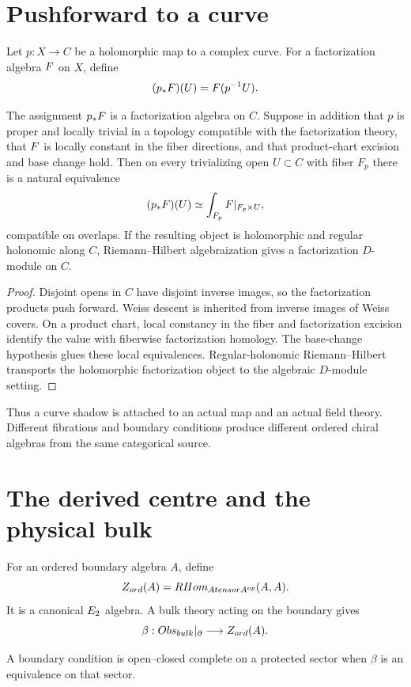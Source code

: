 \chapter{Pushforward to a curve}
Let $p:X\to C$ be a holomorphic map to a complex curve. For a factorization algebra $F$ on $X$, define
\[
 (p_*F)(U)=F(p^{-1}U).
\]

\begin{theorem}
The assignment $p_*F$ is a factorization algebra on $C$. Suppose in addition that $p$ is proper and locally trivial in a topology compatible with the factorization theory, that $F$ is locally constant in the fiber directions, and that product-chart excision and base change hold. Then on every trivializing open $U\subset C$ with fiber $F_p$ there is a natural equivalence
\[
 (p_*F)(U)\simeq
 \int_{F_p}F|_{F_p\times U},
\]
compatible on overlaps. If the resulting object is holomorphic and regular holonomic along $C$, Riemann--Hilbert algebraization gives a factorization $D$-module on $C$.
\end{theorem}
\begin{proof}
Disjoint opens in $C$ have disjoint inverse images, so the factorization products push forward. Weiss descent is inherited from inverse images of Weiss covers. On a product chart, local constancy in the fiber and factorization excision identify the value with fiberwise factorization homology. The base-change hypothesis glues these local equivalences. Regular-holonomic Riemann--Hilbert transports the holomorphic factorization object to the algebraic $D$-module setting.
\end{proof}

Thus a curve shadow is attached to an actual map and an actual field theory. Different fibrations and boundary conditions produce different ordered chiral algebras from the same categorical source.

\chapter{The derived centre and the physical bulk}
For an ordered boundary algebra $A$, define
\[
 Z_{ord}(A)=RHom_{Atensor A^{op}}(A,A).
\]
It is a canonical $E_2$ algebra. A bulk theory acting on the boundary gives
\[
 \beta:Obs_{bulk}|_{\partial}\longrightarrow Z_{ord}(A).
\]

\begin{definition}
A boundary condition is open--closed complete on a protected sector when $\beta$ is an equivalence on that sector.
\end{definition}

